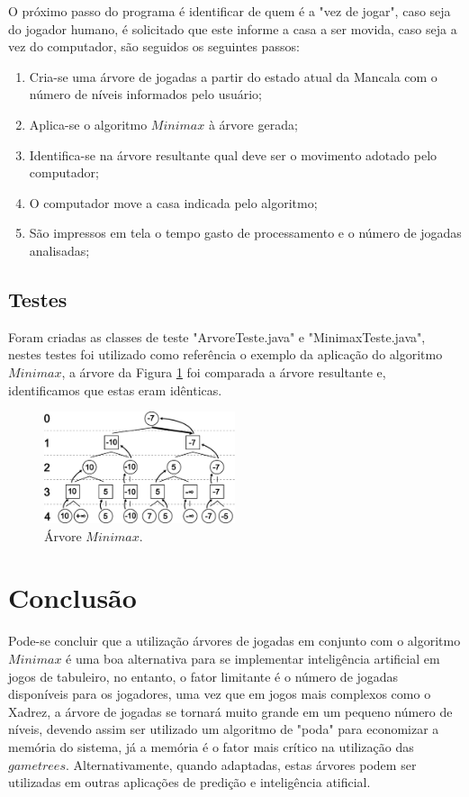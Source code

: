\documentclass[a4paper,11pt]{article}
\begin{document}
O próximo passo do programa é identificar de quem é a "vez de jogar", caso seja do jogador humano, é solicitado que este informe a casa a ser movida, caso seja a vez do computador, são seguidos os seguintes passos:

\begin{enumerate}
\item Cria-se uma árvore de jogadas a partir do estado atual da Mancala com o número de níveis informados pelo usuário;
\item Aplica-se o algoritmo $Minimax$ à árvore gerada;
\item Identifica-se na árvore resultante qual deve ser o movimento adotado pelo computador;
\item O computador move a casa indicada pelo algoritmo;
\item São impressos em tela o tempo gasto de processamento e o número de jogadas analisadas;
\end{enumerate}

\subsection{Testes}
Foram criadas as classes de teste "ArvoreTeste.java" e "MinimaxTeste.java", nestes testes foi utilizado como referência o exemplo da aplicação do algoritmo $Minimax$, a árvore da Figura \ref{fig:Minimax} foi comparada a árvore resultante e, identificamos que estas eram idênticas.

\begin{figure}[h!]
    \includegraphics[width=0.5\textwidth]{minimax.pdf}
  \centering
  \caption{Árvore $Minimax$\cite{MINIMAX}.}\label{fig:Minimax}
  \centering

\end{figure}

\section{Conclusão}
Pode-se concluir que a utilização árvores de jogadas em conjunto com o algoritmo $Minimax$ é uma boa alternativa para se implementar inteligência artificial em jogos de tabuleiro, no entanto, o fator limitante é o número de jogadas disponíveis para os jogadores, uma vez que em jogos mais complexos como o Xadrez, a árvore de jogadas se tornará muito grande em um pequeno número de níveis, devendo assim ser utilizado um algoritmo de "poda" para economizar a memória do sistema, já a memória é o fator mais crítico na utilização das $game trees$.
Alternativamente, quando adaptadas, estas árvores podem ser utilizadas em outras aplicações de predição e inteligência atificial.

\nocite{*}					%
		
		
\end{document}
